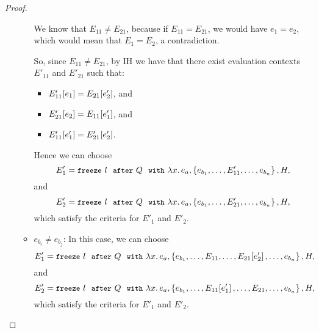\begin{proof}
\begin{itemize}
\begin{itemize}
      We know that $E_{11} \neq E_{21}$, because if $E_{11} = E_{21}$,
      we would have $e_1 = e_2$, which would mean that $E_1 = E_2$, a
      contradiction.

      So, since $E_{11} \neq E_{21}$, by IH we have that there exist
      evaluation contexts $E'_{11}$ and $E'_{21}$ such that:
      \begin{itemize}
      \item $E'_{11}\hspace{-0.5mm}\left[e_1\right] = E_{21}\hspace{-0.5mm}\left[e'_2\right]$, and
      \item $E'_{21}\hspace{-0.5mm}\left[e_2\right] = E_{11}\hspace{-0.5mm}\left[e'_1\right]$, and
      \item $E'_{11}\hspace{-0.5mm}\left[e'_1\right] = E'_{21}\hspace{-0.5mm}\left[e'_2\right]$.
      \end{itemize}
      Hence we can choose
      \[E'_1 = \mbox{\small{\texttt{freeze}}}~l~~{\mbox{\small{\texttt{after}}}}~Q~~{\mbox{\small{\texttt{with}}}}~\lambda x.\,e_a, \left\{e_{b_1}, \dots,
          E'_{11}, \dots, e_{b_n}\right\}, H,\] and
      \[E'_2 = \mbox{\small{\texttt{freeze}}}~l~~{\mbox{\small{\texttt{after}}}}~Q~~{\mbox{\small{\texttt{with}}}}~\lambda x.\,e_a, \left\{e_{b_1}, \dots,
          E'_{21}, \dots, e_{b_n}\right\}, H,\] which satisfy the criteria
      for $E'_1$ and $E'_2$.

    \item $e_{b_i} \neq e_{b_j}$:
      In this case, we can choose
      \[E'_1 = \mbox{\small{\texttt{freeze}}}~l~~{\mbox{\small{\texttt{after}}}}~Q~~{\mbox{\small{\texttt{with}}}}~\lambda x.\,e_a, \left\{e_{b_1},
          \dots, E_{11}, \dots, E_{21}\hspace{-0.5mm}\left[e'_2\right], \dots,
          e_{b_n}\right\}, H,\] and
      \[E'_2 = \mbox{\small{\texttt{freeze}}}~l~~{\mbox{\small{\texttt{after}}}}~Q~~{\mbox{\small{\texttt{with}}}}~\lambda x.\,e_a, \left\{e_{b_1},
          \dots, E_{11}\hspace{-0.5mm}\left[e'_1\right], \dots, E_{21}, \dots,
          e_{b_n}\right\}, H,\] which satisfy the criteria for $E'_1$ and
      $E'_2$.
    \end{itemize}
  \end{itemize}
\end{proof}
